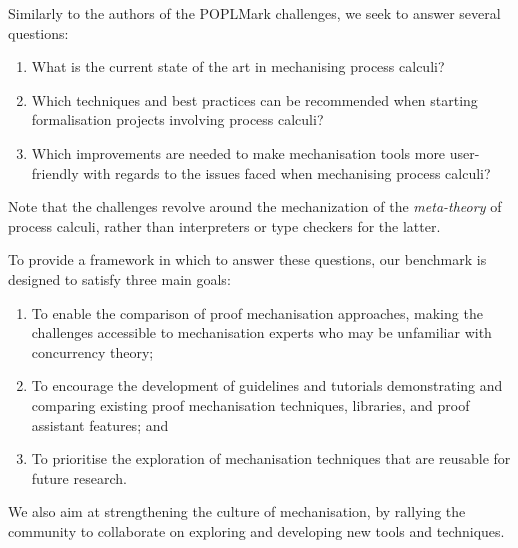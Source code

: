 \documentclass[runningheads]{llncs}
\begin{document}
Similarly to the authors of the POPLMark challenges, we seek to
answer several questions:
\begin{enumerate}[label=\textbf{(Q\arabic*)},leftmargin=10mm]
\item\label{item:rq1} What is the current state of the art in mechanising process calculi?
\item\label{item:rq2} Which techniques and best practices can be recommended when starting formalisation projects involving process calculi?
\item\label{item:rq3} Which improvements are needed to make mechanisation tools more user-friendly with regards to the issues faced when mechanising process calculi?
\end{enumerate}
%
Note that the challenges revolve around the mechanization of the
\emph{meta-theory} of process calculi, rather than interpreters or
type checkers for the latter.

To provide a framework in which to answer these questions, our benchmark is designed to satisfy three main goals:
\begin{enumerate}[label=\textbf{(G\arabic*)},leftmargin=10mm]
\item\label{item:goal-comperison-accessibility} To enable the comparison of
  proof mechanisation approaches, making the challenges accessible to
  mechanisation experts who may be unfamiliar with concurrency theory;

\item\label{item:goal-tutorials} To encourage the development of guidelines and
  tutorials demonstrating and comparing existing proof mechanisation
  techniques, libraries, and proof assistant features; and

\item\label{item:goal-reusability} To prioritise the exploration of mechanisation
  techniques that are reusable for future research.
\end{enumerate}
We also aim at strengthening the culture of mechanisation, by rallying the community to collaborate on exploring and developing new tools and techniques.
\end{document}
